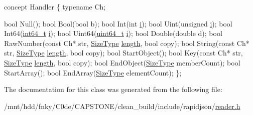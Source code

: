 \begin{DoxyCode}
concept Handler \{
    \textcolor{keyword}{typename} Ch;

    \textcolor{keywordtype}{bool} Null();
    \textcolor{keywordtype}{bool} Bool(\textcolor{keywordtype}{bool} b);
    \textcolor{keywordtype}{bool} Int(\textcolor{keywordtype}{int} \hyperlink{game__play__state_8cpp_acb559820d9ca11295b4500f179ef6392}{i});
    \textcolor{keywordtype}{bool} Uint(\textcolor{keywordtype}{unsigned} \hyperlink{game__play__state_8cpp_acb559820d9ca11295b4500f179ef6392}{i});
    \textcolor{keywordtype}{bool} Int64(\hyperlink{stdint_8h_a414156feea104f8f75b4ed9e3121b2f6}{int64\_t} \hyperlink{game__play__state_8cpp_acb559820d9ca11295b4500f179ef6392}{i});
    \textcolor{keywordtype}{bool} Uint64(\hyperlink{stdint_8h_aec6fcb673ff035718c238c8c9d544c47}{uint64\_t} \hyperlink{game__play__state_8cpp_acb559820d9ca11295b4500f179ef6392}{i});
    \textcolor{keywordtype}{bool} Double(\textcolor{keywordtype}{double} d);
    \textcolor{keywordtype}{bool} RawNumber(\textcolor{keyword}{const} Ch* str, \hyperlink{rapidjson_8h_a5ed6e6e67250fadbd041127e6386dcb5}{SizeType} \hyperlink{imgui__impl__opengl3__loader_8h_a011fc24f10426c01349e94a4edd4b0d5}{length}, \textcolor{keywordtype}{bool} copy);
    \textcolor{keywordtype}{bool} String(\textcolor{keyword}{const} Ch* str, \hyperlink{rapidjson_8h_a5ed6e6e67250fadbd041127e6386dcb5}{SizeType} \hyperlink{imgui__impl__opengl3__loader_8h_a011fc24f10426c01349e94a4edd4b0d5}{length}, \textcolor{keywordtype}{bool} copy);
    \textcolor{keywordtype}{bool} StartObject();
    \textcolor{keywordtype}{bool} Key(\textcolor{keyword}{const} Ch* str, \hyperlink{rapidjson_8h_a5ed6e6e67250fadbd041127e6386dcb5}{SizeType} \hyperlink{imgui__impl__opengl3__loader_8h_a011fc24f10426c01349e94a4edd4b0d5}{length}, \textcolor{keywordtype}{bool} copy);
    \textcolor{keywordtype}{bool} EndObject(\hyperlink{rapidjson_8h_a5ed6e6e67250fadbd041127e6386dcb5}{SizeType} memberCount);
    \textcolor{keywordtype}{bool} StartArray();
    \textcolor{keywordtype}{bool} EndArray(\hyperlink{rapidjson_8h_a5ed6e6e67250fadbd041127e6386dcb5}{SizeType} elementCount);
\};
\end{DoxyCode}
 

The documentation for this class was generated from the following file\+:\begin{DoxyCompactItemize}
\item 
/mnt/hdd/fnky/\+C0de/\+C\+A\+P\+S\+T\+O\+N\+E/clean\+\_\+build/include/rapidjson/\hyperlink{reader_8h}{reader.\+h}\end{DoxyCompactItemize}
